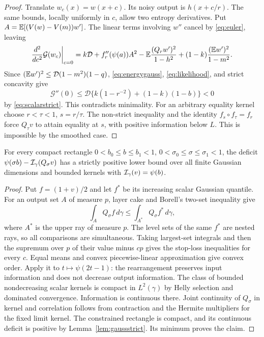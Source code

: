 \begin{proof}
Translate $w_c(x)=w(x+c)$. Its noisy output is $h(x+c/r)$.
The same bounds, locally uniformly in $c$, allow two entropy derivatives.
Put $A=\mathbb E[(V(w)-V(m))w']$. The linear terms involving $w''$
cancel by \eqref{eq:euler}, leaving
\[
 \frac{d^2}{dc^2}\mathcal G(w_c)\bigg|_{c=0}
 =k\mathcal D+f_r''(\psi(a))A^2
 -\mathbb E\frac{(Q_rw')^2}{1-h^2}
 +(1-k)\frac{(\mathbb E w')^2}{1-m^2}.
\]
Since $(\mathbb E w')^2\le\mathcal D(1-m^2)(1-q)$,
\eqref{eq:energygauss}, \eqref{eq:likelihood}, and strict concavity give
\[
 \mathcal G''(0)\le\mathcal D
 \{k(1-r^{-2})+(1-k)(1-b)\}<0
\]
by \eqref{eq:scalarstrict}. This contradicts minimality.
For an arbitrary equality kernel choose $r<\tau<1$, $s=r/\tau$.
The non-strict inequality and the identity $f_s\circ f_\tau=f_r$ force
$Q_\tau v$ to attain equality at $s$, with positive information below
$L$. This is impossible by the smoothed case.
\end{proof}

\begin{corollary}\label{cor:gaussgap}
For every compact rectangle $0<b_0\le b\le b_1<1$,
$0<\sigma_0\le\sigma\le\sigma_1<1$, the deficit
$\psi(\sigma b)-\mathcal I_\gamma(Q_\sigma v)$ has a strictly positive
lower bound over all finite Gaussian dimensions and bounded kernels
with $\mathcal I_\gamma(v)=\psi(b)$.
\end{corollary}
\begin{proof}
Put $f=(1+v)/2$ and let $f^*$ be its increasing scalar Gaussian quantile.
For an output set $A$ of measure $p$, layer cake and Borell's two-set
inequality \cite[Theorem 1.1]{MN} give
\[
 \int_A Q_\sigma f\,d\gamma
 \le\int_{A^*}Q_\sigma f^*\,d\gamma,
\]
where $A^*$ is the upper ray of measure $p$. The level sets of the same
$f^*$ are nested rays, so all comparisons are simultaneous.
Taking largest-set integrals and then the supremum over $p$ of their
value minus $cp$ gives the stop-loss inequalities for every $c$.
Equal means and convex piecewise-linear approximation give convex order.
Apply it to $t\mapsto\psi(2t-1)$: the rearrangement preserves input
information and does not decrease output information.
The class of bounded nondecreasing scalar kernels is compact in
$L^2(\gamma)$ by Helly selection and dominated convergence.
Information is continuous there. Joint continuity of $Q_\sigma$ in
kernel and correlation follows from contraction and the Hermite
multipliers for the fixed limit kernel. The constrained rectangle is
compact, and its continuous deficit is positive by
Lemma~\ref{lem:gaussstrict}. Its minimum proves the claim.
\end{proof}

